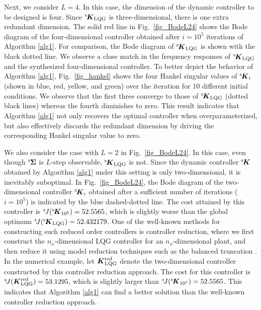 \documentclass[preprint,5p,times,twocolumn]{elsarticle}
\newcommand{\bm}[1]{{\mbox{\boldmath $#1$}}}
\def\rms{{}^{\rm s}\hspace{-0.2mm}}
\def\rmsK{{}^{\rm s}\hspace{-0.4mm}}
\def\rmsJ{{}^{\rm s}\hspace{-0.5mm}}
\begin{document}
Next, we consider $L = 4$. In this case, the dimension of the dynamic controller to be designed is four.
Since $\rmsK {\bm K}_{\rm LQG}$ is three-dimensional, there is one extra redundant dimension.
The solid red line in Fig.~\ref{fig_BodeL24} shows the Bode diagram of the four-dimensional controller obtained after $i = 10^5$ iterations of  Algorithm \ref{alg1}.
For comparison, the Bode diagram of $\rmsK {\bm K}_{\rm LQG}$ is shown with the black dotted line. We observe a close match in the frequency responses of $\rmsK{\bm K}_{\rm LQG}$ and the synthesized four-dimensional controller. 
To better depict the behavior of Algorithm \ref{alg1}, Fig.~\ref{fig_hankel} shows the four Hankel singular values of $\rmsK{\bm K}_i$ (shown in blue, red, yellow, and green) over the iteration for $10$ different initial conditions. 
We observe that the first three converge to those of $\rmsK{\bm K}_{\rm LQG}$ (dotted black lines) whereas the fourth diminishes to zero. This result indicates that Algorithm \ref{alg1} not only recovers the optimal controller when overparameterized, but also effectively discards the redundant dimension by driving the corresponding Hankel singular value to zero.

We also consider the case with $L=2$ in Fig.~\ref{fig_BodeL24}.
In this case, even though $\rms {\bm \Sigma}$ is $L$-step observable, $\rmsK {\bm K}_{\rm LQG}$ is not. Since the dynamic controller
$\rmsK {\bm K}$ obtained by Algorithm \ref{alg1} under this setting is only two-dimensional, it is inevitably suboptimal. In Fig.~\ref{fig_BodeL24}, the Bode diagram of the two-dimensional controller $\rmsK {\bm K}_i$ obtained after a sufficient number of iterations ($i = 10^5$) is indicated by the blue dashed-dotted line. 
The cost attained by this controller is $\rmsJ J(\rmsK {\bm K}_{10^5}) = 52.5565$, which is slightly worse than the global optimum $\rmsJ J(\rmsK{\bm K}_{\rm LQG}) = 52.432179$. 
One of the well-known methods for constructing such reduced order controllers is controller reduction, where we first construct the $n_x$-dimensional LQG controller for an $n_x$-dimensional plant, and then reduce it using model reduction techniques such as the balanced truncation \cite{antoulas2005approximation}. In the numerical example, let ${\bm K}_{\rm LQG}^{\rm red}$ denote the two-dimensional controller constructed by this controller reduction approach. The cost for this controller is $\rmsJ J({\bm K}_{\rm LQG}^{\rm red}) = 53.1295$, which is slightly larger than $\rmsJ J(\rmsK {\bm K}_{10^5}) = 52.5565$. This indicates that Algorithm \ref{alg1} can find a better solution than the well-known controller reduction approach. 
\end{document}
